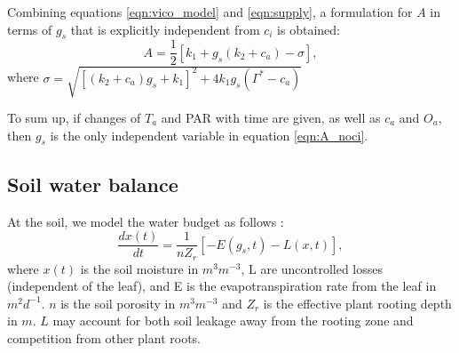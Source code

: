\documentclass[utf8]{frontiersSCNS} %
\begin{document}
Combining equations \ref{eqn:vico_model} and \ref{eqn:supply}, a formulation for $A$ in terms of $g_s$ that is explicitly independent from $c_i$ is obtained:
\begin{equation}
    \label{eqn:A_noci}
    A = \frac{1}{2}[k_1 + g_s(k_2 + c_a) - \sigma],
\end{equation}
where $\sigma = \sqrt{[(k_2 + c_a)g_s + k_1]^2 + 4k_1 g_s (\Gamma^*-c_a)}$

To sum up, if changes of $T_a$ and PAR with time are given, as well as $c_a$ and $O_a$, then $g_s$ is the only independent variable in equation \ref{eqn:A_noci}.

\subsection{Soil water balance}


At the soil, we model the water budget as follows \citep{Rodriguez-Iturbe2007}:
\begin{equation}
    \label{eqn:soil_water}
    \frac{dx(t)}{dt} =\frac{1}{n Z_r}[- E(g_s, t) - L(x, t)],
\end{equation}
where $x(t)$ is the soil moisture in $m^3m^{-3}$, L are uncontrolled losses (independent of the leaf), and E is the evapotranspiration rate from the leaf in $m^2d^{-1}$. $n$ is the soil porosity in $m^3m^{-3}$ and $Z_r$ is the effective plant rooting depth in $m$. $L$ may account for both soil leakage away from the rooting zone and competition from other plant roots.
\end{document}
